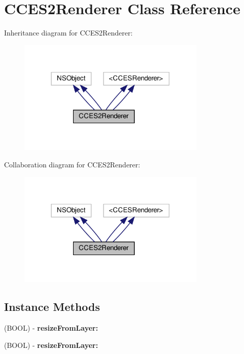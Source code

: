 \hypertarget{interfaceCCES2Renderer}{}\section{C\+C\+E\+S2\+Renderer Class Reference}
\label{interfaceCCES2Renderer}


Inheritance diagram for C\+C\+E\+S2\+Renderer\+:
\nopagebreak
\begin{figure}[H]
\begin{center}
\leavevmode
\includegraphics[width=254pt]{interfaceCCES2Renderer__inherit__graph}
\end{center}
\end{figure}


Collaboration diagram for C\+C\+E\+S2\+Renderer\+:
\nopagebreak
\begin{figure}[H]
\begin{center}
\leavevmode
\includegraphics[width=254pt]{interfaceCCES2Renderer__coll__graph}
\end{center}
\end{figure}
\subsection*{Instance Methods}
\begin{DoxyCompactItemize}
\item 
\mbox{\label{interfaceCCES2Renderer_ad9129832fa021f4fcf24f53ff2ce8f81}} 
(B\+O\+OL) -\/ {\bfseries resize\+From\+Layer\+:}
\item 
\mbox{\label{interfaceCCES2Renderer_ad9129832fa021f4fcf24f53ff2ce8f81}} 
(B\+O\+OL) -\/ {\bfseries resize\+From\+Layer\+:}
\end{DoxyCompactItemize}
